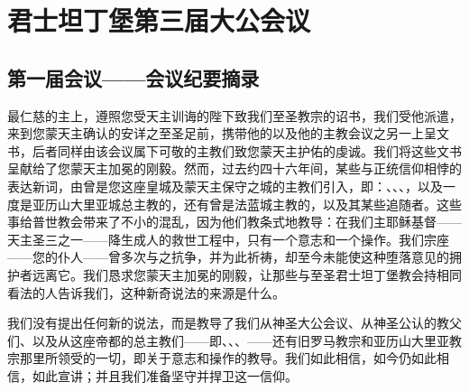 
\chapter{君士坦丁堡第三届大公会议}



\section{第一届会议——会议纪要摘录}

\par

最仁慈的主上，遵照您受天主训诲的陛下致我们至圣教宗的诏书，我们受他派遣，来到您蒙天主确认的安详之至圣足前，携带他的以及他的主教会议之另一上呈文书，后者同样由该会议属下可敬的主教们致您蒙天主护佑的虔诚。我们将这些文书呈献给了您蒙天主加冕的刚毅。然而，过去约四十六年间，某些与正统信仰相悖的表达新词，由曾是您这座皇城及蒙天主保守之城的主教们引入，即：、、、，以及一度是亚历山大里亚城总主教的，还有曾是法蓝城主教的，以及其某些追随者。这些事给普世教会带来了不小的混乱，因为他们教条式地教导：在我们主耶稣基督——天主圣三之一——降生成人的救世工程中，只有一个意志和一个操作。我们宗座——您的仆人——曾多次与之抗争，并为此祈祷，却至今未能使这种堕落意见的拥护者远离它。我们恳求您蒙天主加冕的刚毅，让那些与至圣君士坦丁堡教会持相同看法的人告诉我们，这种新奇说法的来源是什么。\par

\par

我们没有提出任何新的说法，而是教导了我们从神圣大公会议、从神圣公认的教父们、以及从这座帝都的总主教们——即、、、——还有旧罗马教宗和亚历山大里亚教宗那里所领受的一切，即关于意志和操作的教导。我们如此相信，如今仍如此相信，如此宣讲；并且我们准备坚守并捍卫这一信仰。\par

